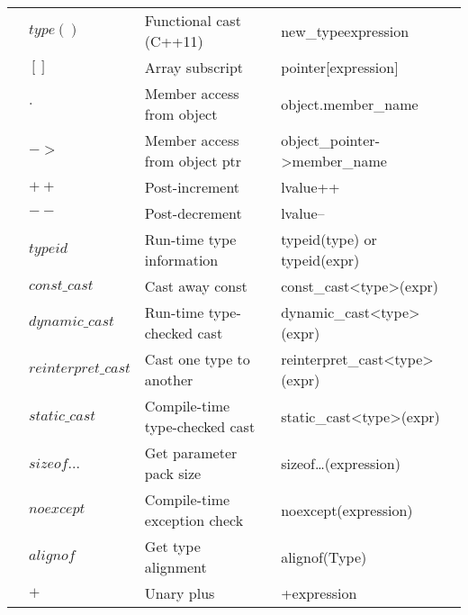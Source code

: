 \documentclass[../../LearnCpp.tex]{subfiles}
\begin{document}
\begin{center}
\begin{tiny}
\begin{tabularx}{ 1\textwidth}{
        | >{\raggedright\arraybackslash}X
        | >{\raggedright\arraybackslash}X
        | >{\raggedright\arraybackslash}X
        | >{\raggedright\arraybackslash}X |
      }
                                  & $type()$            & Functional cast (C++11)           & new\_type{expression}                 \\
                                  & $[]$                & Array subscript                   & pointer[expression]                   \\
                                  & $.$                 & Member access from object         & object.member\_name                   \\
                                  & $->$                & Member access from object ptr     & object\_pointer->member\_name         \\
                                  & $++$                & Post-increment                    & lvalue++                              \\
                                  & $--$                & Post-decrement                    & lvalue--                              \\
                                  & $typeid$            & Run-time type information         & typeid(type) or typeid(expr)          \\
                                  & $const\_cast$       & Cast away const                   & const\_cast<type>(expr)               \\
                                  & $dynamic\_cast$     & Run-time type-checked cast        & dynamic\_cast<type>(expr)             \\
                                  & $reinterpret\_cast$ & Cast one type to another          & reinterpret\_cast<type>(expr)         \\
                                  & $static\_cast$      & Compile-time type-checked cast    & static\_cast<type>(expr)              \\
                                  & $sizeof...$         & Get parameter pack size           & sizeof…(expression)                   \\
                                  & $noexcept$          & Compile-time exception check      & noexcept(expression)                  \\
                                  & $alignof$           & Get type alignment                & alignof(Type)                         \\
      \hline
      \multirow{15}{5em}{3 R->L}  & $+$                 & Unary plus                        & +expression                           \\

\end{tabularx}
\end{tiny}
\end{center}
\end{document}
